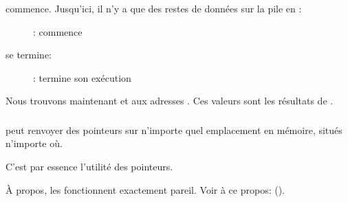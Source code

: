 \clearpage
\ttfone commence.
Jusqu'ici, il n'y a que des restes de données sur la pile en \PtrsAddresses :

\begin{figure}[H]
\centering
{}
\caption{\olly: \ttfone commence}
\label{fig:pointers_olly_stk_2}
\end{figure}

\clearpage
\ttfone se termine:

\begin{figure}[H]
\centering
{}
\caption{\olly: \ttfone termine son exécution}
\label{fig:pointers_olly_stk_3}
\end{figure}

Nous trouvons maintenant  et  aux adresses \PtrsAddresses.
Ces valeurs sont les résultats de \ttfone.

\subsubsection{\Conclusion{}}
 
\ttfone peut renvoyer des pointeurs sur n'importe quel emplacement en mémoire, situés
n'importe où.

C'est par essence l'utilité des pointeurs.

À propos, les  \Cpp fonctionnent exactement pareil. Voir à ce propos:
().
